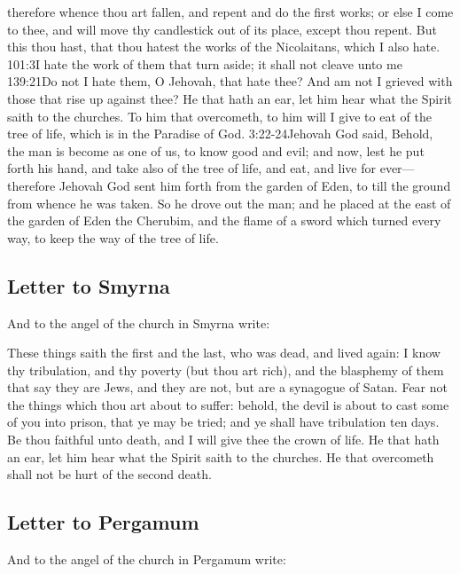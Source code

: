 therefore whence thou art fallen, and repent and do the first works; or else I come to thee, and will move thy candlestick out of its place, except thou repent. %
But this thou hast, that thou hatest the works of the Nicolaitans, which I also hate.%
			{101:3}{I hate the work of them that turn aside; it shall not cleave unto me}%
			{139:21}{Do not I hate them, O Jehovah, that hate thee? And am not I grieved with those that rise up against thee?} %
He that hath an ear, let him hear what the Spirit saith to the churches. To him that overcometh, to him will I give to eat of the tree of life, which is in the Paradise of God.%
				{3:22-24}{Jehovah God said, Behold, the man is become as one of us, to know good and evil; and now, lest he put forth his hand, and take also of the tree of life, and eat, and live for ever— therefore Jehovah God sent him forth from the garden of Eden, to till the ground from whence he was taken. So he drove out the man; and he placed at the east of the garden of Eden the Cherubim, and the flame of a sword which turned every way, to keep the way of the tree of life.}
\subsection*{Letter to Smyrna}
And to the angel of the church in Smyrna write:

These things saith the first and the last, who was dead, and lived again: %
I know thy tribulation, and thy poverty (but thou art rich), and the blasphemy of them that say they are Jews, and they are not, but are a synagogue of Satan. %
Fear not the things which thou art about to suffer: behold, the devil is about to cast some of you into prison, that ye may be tried; and ye shall have tribulation ten days.%
Be thou faithful unto death, and I will give thee the crown of life. %
He that hath an ear, let him hear what the Spirit saith to the churches. He that overcometh shall not be hurt of the second death.
\subsection*{Letter to Pergamum}
And to the angel of the church in Pergamum write:

